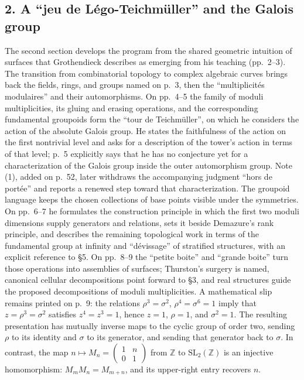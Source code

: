 \documentclass[11pt,a4paper]{article}
\begin{document}
\subsection*{2. A ``jeu de Légo-Teichmüller'' and the Galois group}
The second section develops the program from the shared geometric
intuition of surfaces that Grothendieck describes as emerging from his
teaching (pp.~2--3). The transition from combinatorial topology to complex
algebraic curves brings back the fields, rings, and groups named on p.~3,
then the ``multiplicités modulaires'' and their automorphisms. On
pp.~4--5 the family of moduli multiplicities, its gluing and erasing
operations, and the corresponding fundamental groupoids form the
``tour de Teichmüller'', on which he considers the action of the absolute
Galois group. He states the faithfulness of the action on the first
nontrivial level and asks for a description of the tower's action in terms
of that level; p.~5 explicitly says that he has no conjecture yet for a
characterization of the Galois group inside the outer automorphism group.
Note (1), added on p.~52, later withdraws the accompanying judgment
``hors de portée'' and reports a renewed step toward that characterization.
The groupoid language keeps the chosen collections of base points visible
under the symmetries. On pp.~6--7 he formulates the construction principle
in which the first two moduli dimensions supply generators and relations,
sets it beside Demazure's rank principle, and describes the remaining
topological work in terms of the fundamental group at infinity and
``dévissage'' of stratified structures, with an explicit reference to
\S5. On pp.~8--9 the ``petite boite'' and ``grande boite'' turn those
operations into assemblies of surfaces; Thurston's surgery is named,
canonical cellular decompositions point forward to \S3, and real
structures guide the proposed decompositions of moduli multiplicities.
A mathematical slip remains printed on p.~9: the relations
$\rho^3=\sigma^2$, $\rho^4=\sigma^6=1$ imply that
$z=\rho^3=\sigma^2$ satisfies $z^4=z^3=1$, hence $z=1$,
$\rho=1$, and $\sigma^2=1$. The resulting presentation has mutually
inverse maps to the cyclic group of order two, sending $\rho$ to its
identity and $\sigma$ to its generator, and sending that generator back
to $\sigma$. In contrast, the map
$n\longmapsto M_n=\left(\begin{smallmatrix}1&n\\0&1\end{smallmatrix}\right)$
from $\mathbb Z$ to $\mathrm{SL}_2(\mathbb Z)$ is an injective
homomorphism: $M_mM_n=M_{m+n}$, and its upper-right entry recovers $n$.
\end{document}
